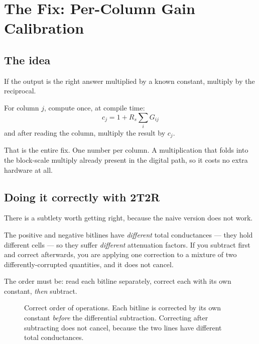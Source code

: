 \documentclass[11pt,a4paper]{report}
\begin{document}
\chapter{The Fix: Per-Column Gain Calibration}

\section{The idea}

If the output is the right answer multiplied by a known constant, multiply by
the reciprocal.

For column $j$, compute once, at compile time:
\[
c_j = 1 + R_s \sum_i G_{ij}
\]
and after reading the column, multiply the result by $c_j$.

That is the entire fix. One number per column. A multiplication that folds
into the block-scale multiply already present in the digital path, so it costs
no extra hardware at all.

\section{Doing it correctly with 2T2R}

There is a subtlety worth getting right, because the naive version does not
work.

The positive and negative bitlines have \emph{different} total conductances
--- they hold different cells --- so they suffer \emph{different} attenuation
factors. If you subtract first and correct afterwards, you are applying one
correction to a mixture of two differently-corrupted quantities, and it does
not cancel.

The order must be: read each bitline separately, correct each with its own
constant, \emph{then} subtract.

\begin{figure}[h]
\centering
{}
\caption{Correct order of operations. Each bitline is corrected by its own
constant \emph{before} the differential subtraction. Correcting after
subtracting does not cancel, because the two lines have different total
conductances.}
\end{figure}
\end{document}
